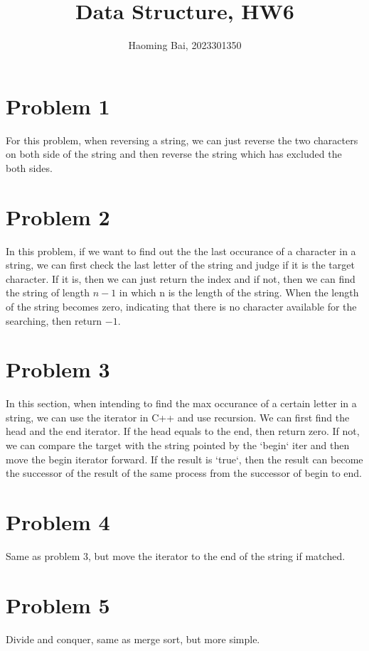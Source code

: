 \documentclass{article}
\title{Data Structure, HW6}
\author{Haoming Bai, 2023301350}
\begin{document}
	\maketitle
	\section*{Problem 1}
	For this problem, when reversing a string, we can just reverse the two characters on both side of the string and then reverse the string which has excluded the both sides.
	
	\section*{Problem 2}
	In this problem, if we want to find out the the last occurance of a character in a string, we can first check the last letter of the string and judge if it is the target character. If it is, then we can just return the index and if not, then we can find the string of length $n-1$ in which n is the length of the string. When the length of the string becomes zero, indicating that there is no character available for the searching, then return $-1$.
  
  \section*{Problem 3}
  In this section, when intending to find the max occurance of a certain letter in a string, we can use the iterator in C++ and use recursion. We can first find the head and the end iterator. If the head equals to the end, then return zero. If not, we can compare the target with the string pointed by the  `begin` iter and then move the begin iterator forward. If the result is `true`, then the result can become the successor of the result of the same process from the successor of begin to end.
  
  \section*{Problem 4}
  Same as problem 3, but move the iterator to the end of the string if matched.
  
  \section*{Problem 5}
  Divide and conquer, same as merge sort, but more simple.
  
\end{document}

